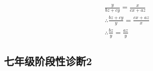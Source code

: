 \documentclass[answers]{exam} %
\begin{document}
\begin{questions}
\begin{parts}
  \vspace*{1in}
  
  \begin{solution}
    \[
    \begin{split}
      \frac{y}{bz+cy}=\frac{x}{cx+az} \\
      \therefore \frac{bz+cy}{y}=\frac{cx+az}{x} \\
      \therefore \frac{bz}{y}=\frac{az}{y}
    \end{split}
  \]
  \end{solution}

\end{parts}

\end{questions}

\subsection{七年级阶段性诊断2}
\end{document}
